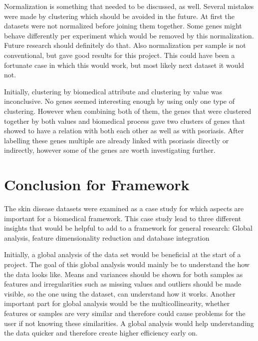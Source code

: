\documentclass[10pt,a4paper]{article}
\begin{document}
	Normalization is something that needed to be discussed, as well. Several mistakes were made by clustering which should be avoided in the future. At first the datasets were not normalized before joining them together. Some genes might behave differently per experiment which would be removed by this normalization. Future research should definitely do that. Also normalization per sample is not conventional, but gave good results for this project. This could have been a fortunate case in which this would work, but most likely next dataset it would not.
	
	Initially, clustering by biomedical attribute and clustering by value was inconclusive. No genes seemed interesting enough by using only one type of clustering. However when combining both of them, the genes that were clustered together by both values and biomedical process gave two clusters of genes that showed to have a relation with both each other as well as with psoriasis. After labelling these genes multiple are already linked with psoriasis directly or indirectly, however some of the genes are worth investigating further.
	
	\section{Conclusion for Framework}
	\label{sec:DiscussionForFramework}
	
	The skin disease datasets were examined as a case study for which aspects are important for a biomedical framework. This case study lead to three different insights that would be helpful to add to a framework for general research: Global analysis, feature dimensionality reduction and database integration
	
	Initially, a global analysis of the data set would be beneficial at the start of a project. The goal of this global analysis would mainly be to understand the how the data looks like. Means and variances should be shown for both samples as features and irregularities such as missing values and outliers should be made visible, so the one using the dataset, can understand how it works. Another important part for global analysis would be the multicollinearity, whether features or samples are very similar and therefore could cause problems for the user if not knowing these similarities. A global analysis would help understanding the data quicker and therefore create higher efficiency early on.
	
\end{document}
